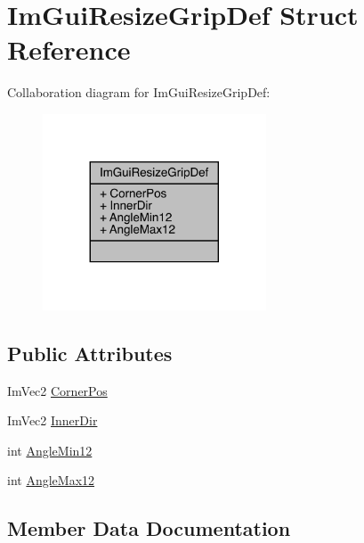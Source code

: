 \hypertarget{struct_im_gui_resize_grip_def}{}\section{Im\+Gui\+Resize\+Grip\+Def Struct Reference}
\label{struct_im_gui_resize_grip_def}


Collaboration diagram for Im\+Gui\+Resize\+Grip\+Def\+:
\nopagebreak
\begin{figure}[H]
\begin{center}
\leavevmode
\includegraphics[width=188pt]{d9/dc9/struct_im_gui_resize_grip_def__coll__graph}
\end{center}
\end{figure}
\subsection*{Public Attributes}
\begin{DoxyCompactItemize}
\item 
Im\+Vec2 \mbox{\hyperlink{struct_im_gui_resize_grip_def_ab8ffa45cb1ef3e825f5817b60c1555aa}{Corner\+Pos}}
\item 
Im\+Vec2 \mbox{\hyperlink{struct_im_gui_resize_grip_def_a82a1367d835f206fc24b3f114c60f897}{Inner\+Dir}}
\item 
int \mbox{\hyperlink{struct_im_gui_resize_grip_def_a5b335b7be8f517e38c56a5fd8e01d54c}{Angle\+Min12}}
\item 
int \mbox{\hyperlink{struct_im_gui_resize_grip_def_a697cdecca28177e275ce7ec38ef8e802}{Angle\+Max12}}
\end{DoxyCompactItemize}


\subsection{Member Data Documentation}
\mbox{\label{struct_im_gui_resize_grip_def_a697cdecca28177e275ce7ec38ef8e802}} 
